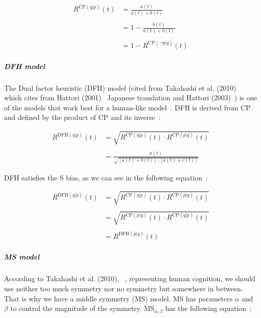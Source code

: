 \begin{equation}
\begin{split}
R^{\text{CP}(q|p)}(t) &= \frac{a(t)}{a(t)+b(t)}\\
\\
&= 1 - \frac{b(t)}{a(t)+b(t)}\\
\\
&= 1- R^{\text{CP}(\neg p|q)}(t)
\end{split}
\end{equation}


\subparagraph{DFH model}

The Dual factor heuristic (DFH) model (cited from Takahashi et al. (2010)~\cite{cogn} which cites from Hattori (2001)~\cite{hattori01} Japanese translation and Hattori (2003)~\cite{hattori03}) is one of the models that work best for a human-like model~\cite{hattori07,cogn}. DFH is derived from CP and defined by the product of CP and its inverse~\cite{cogn}:
\vspace{10pt}

\begin{equation}
\begin{split}
R^{\text{DFH}(q|p)}(t) &= \sqrt{ R^{\text{CP}(q|p)}(t) \cdot R^{\text{CP}(p|q)}(t)}\\
\\
&= \frac{a(t)}{\sqrt{[a(t)+b(t)]\cdot [a(t)+c(t)]}}
\end{split}
\end{equation}
\vspace{10pt}

 DFH satisfies the S bias, as we can see in the following equation~\cite{cogn}:
\vspace{10pt}

\begin{equation}
\begin{split}
R^{\text{DFH}(q|p)}(t) &= \sqrt{ R^{\text{CP}(q|p)}(t) \cdot R^{\text{CP}(p|q)}(t)}\\
\\
&= \sqrt{ R^{\text{CP}(p|q)}(t) \cdot R^{\text{CP}(q|p)}(t)}\\
\\
&= R^{\text{DFH}(p|q)}(t)
\end{split}
\end{equation}
\vspace{10pt}


\subparagraph{MS model}

According to Takahashi et al. (2010), ~\cite{cogn}, representing human cognition, we should use neither too much symmetry nor no symmetry but somewhere in between. That is why we have a middle symmetry (MS) model. MS has parameters $\alpha$ and $\beta$ to control the magnitude of the symmetry. MS$_{\alpha,\beta}$ has the following equation~\cite{cogn}:
\vspace{10pt}

